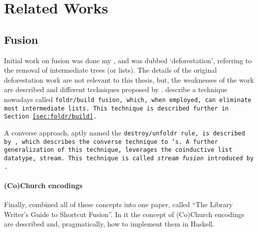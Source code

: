 \section{Related Works}\label{sec:related}

\subsection{Fusion}
Initial work on fusion was done my \cite{Wadler1984,Wadler1986,Wadler1990}, and was dubbed `deforestation', referring to the removal of intermediate trees (or lists).
The details of the original deforestation work are not relevant to this thesis, but, the weaknesses of the work are described and different techniques proposed by \cite{Gill1993}.
\cite{Gill1993} describe a technique nowadays called \tt{foldr/build} fusion, which, when employed, can eliminate most intermediate lists.
This technique is described further in Section \ref{sec:foldr/build}.

A converse approach, aptly named the \tt{destroy/unfoldr} rule, is described by \cite{Svenningsson2002}, which describes the converse technique to \cite{Gill1993}'s.
A further generalization of this technique, leverages the coinductive list datatype, stream. This technique is called \textit{stream fusion} introduced by \cite{Coutts2007}.

\paragraph{(Co)Church encodings}
Finally, \cite{Harper2011} combined all of these concepts into one paper, called ``The Library Writer's Guide to Shortcut Fusion''. In it the concept of (Co)Church encodings are described and, pragmatically, how to implement them in Haskell.